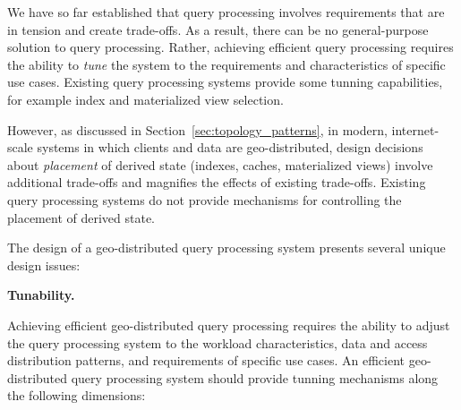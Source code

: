 
We have so far established that query processing involves requirements that are in tension and create trade-offs.
As a result, there can be no general-purpose solution to query processing.
Rather, achieving efficient query processing requires the ability to \textit{tune} the system to the requirements
and characteristics of specific use cases.
Existing query processing systems provide some tunning capabilities, for example index and materialized view selection.

However, as discussed in Section~\ref{sec:topology_patterns}, in modern, internet-scale systems in which clients and data
are geo-distributed,
design decisions about \textit{placement} of derived state (indexes, caches, materialized views) involve additional
trade-offs and magnifies the effects of existing trade-offs.
Existing query processing systems do not provide mechanisms for controlling the placement of derived state.

The design of a geo-distributed query processing system presents several unique design issues:

\bigskip
\noindent
\textbf{Tunability.}

\noindent
Achieving efficient geo-distributed query processing requires the ability to adjust the query processing system
to the workload characteristics, data and access distribution patterns, and requirements of specific use cases.
An efficient geo-distributed query processing system should provide tunning mechanisms along the following dimensions:

